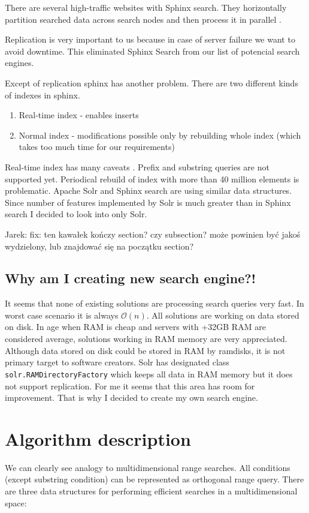 \documentclass[10pt,a4paper]{article}
\newcommand{\jarek}[1]{\noindent\colorbox{myYellow}{Jarek: #1}}
\newcommand{\Oh}{\mathcal{O}}
\begin{document}
There are several high-traffic websites with Sphinx search. They horizontally partition searched data across search nodes and then process it in parallel \cite{SPHINXPARAL}.

Replication is very important to us because in case of server failure we want to avoid downtime. This eliminated Sphinx Search from our list of potencial search engines. 

Except of replication sphinx has another problem. There are two different kinds of indexes in sphinx.
\begin{enumerate}
\item Real-time index - enables inserts
\item Normal index - modifications possible only by rebuilding whole index (which takes too much time for our requirements)
\end{enumerate}

Real-time index has many caveats \cite{SPHINXCAV}. Prefix and substring queries are not supported yet. Periodical rebuild of index with more than 40 million elements is problematic. Apache Solr and Sphinx search are using similar data structures. Since number of features implemented by Solr is much greater than in Sphinx search I decided to look into only Solr. 

\bigskip
\jarek{fix: ten kawałek kończy section? czy subsection? może powinien być jakoś wydzielony, lub znajdować się na początku section?}
\subsection{Why am I creating new search engine?!}
It seems that none of existing solutions are processing search queries very fast. In worst case scenario it is always $\Oh(n)$. All solutions are working on data stored on disk. In age when RAM is cheap and servers with +32GB RAM are considered average, solutions working in RAM memory are very appreciated. Although data stored on disk could be stored in RAM by ramdisks, it is not primary target to software creators. Solr has designated class \verb|solr.RAMDirectoryFactory| which keeps all data in RAM memory but it does not support replication. For me it seems that this area has room for improvement. That is why I decided to create my own search engine.  

\section{Algorithm description}
We can clearly see analogy to multidimensional range searches. All conditions (except substring condition) can be represented as orthogonal range query. There are three data structures for performing efficient searches in a multidimensional space:
\end{document}
